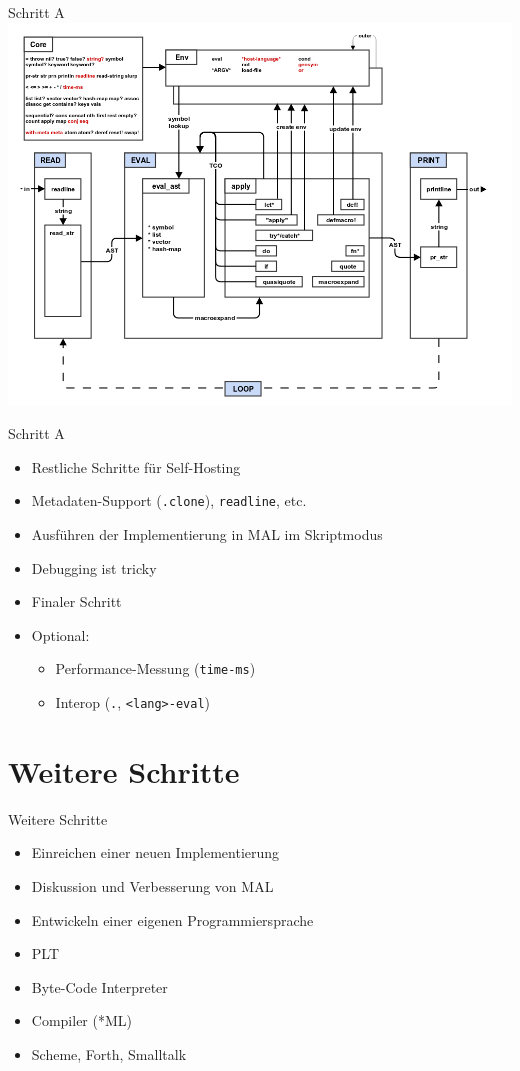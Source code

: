 \documentclass[presentation]{beamer}
\begin{document}
\begin{frame}[label=sec-3-30]{Schritt A}
\includegraphics[width=.9\linewidth]{./images/stepA_mal.png}
\end{frame}

\begin{frame}[fragile,label=sec-3-31]{Schritt A}
 \begin{itemize}
\item Restliche Schritte für Self-Hosting
\item Metadaten-Support (\texttt{.clone}), \texttt{readline}, etc.
\item Ausführen der Implementierung in MAL im Skriptmodus
\item Debugging ist tricky
\item Finaler Schritt
\item Optional:
\begin{itemize}
\item Performance-Messung (\texttt{time-ms})
\item Interop (\texttt{.}, \texttt{<lang>-eval})
\end{itemize}
\end{itemize}
\end{frame}

\section{Weitere Schritte}
\label{sec-4}

\begin{frame}[label=sec-4-1]{Weitere Schritte}
\begin{itemize}
\item Einreichen einer neuen Implementierung
\item Diskussion und Verbesserung von MAL
\item Entwickeln einer eigenen Programmiersprache
\item PLT
\item Byte-Code Interpreter
\item Compiler (*ML)
\item Scheme, Forth, Smalltalk
\end{itemize}
\end{frame}
\end{document}
